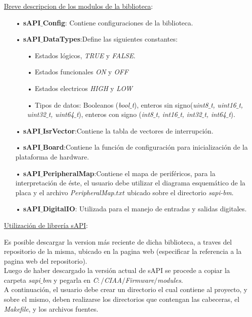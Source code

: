 \documentclass[12pt,letterpaper]{article}
\begin{document}
\underline{Breve descripcion de los modulos de la biblioteca}:
\begin{enumerate}
\item[•]\textbf{sAPI$\_$Config}: Contiene configuraciones de la biblioteca.
\item[•]\textbf{sAPI$\_$DataTypes}:Define las siguientes constantes:
\begin{enumerate}
\item[•]Estados lógicos, \textit{TRUE} y \textit{FALSE}.
\item[•]Estados funcionales \textit{ON} y \textit{OFF}
\item[•]Estados electricos \textit{HIGH} y \textit{LOW}
\item[•]Tipos de datos: Booleanos (\textit{bool$\_$t}), enteros sin signo(\textit{uint8$\_$t, uint16$\_$t, uint32$\_$t, uint64$\_$t}), enteros con signo (\textit{int8$\_$t, int16$\_$t, int32$\_$t, int64$\_$t}).
\end{enumerate}
\item[•]\textbf{sAPI$\_$IsrVector}:Contiene la tabla de vectores de interrupción.
\item[•]\textbf{sAPI$\_$Board}:Contiene la función de configuración para inicialización de la plataforma de hardware.
\item[•]\textbf{sAPI$\_$PeripheralMap}:Contiene el mapa de periféricos, para la interpretación de éste, el usuario debe utilizar el diagrama esquemático de la placa y el archivo \textit{PeripheralMap$.txt$} ubicado sobre el directorio \textit{sapi-bm}.
\item[•]\textbf{sAPI$\_$DigitalIO}: Utilizada para el manejo de entradas y salidas digitales.
\end{enumerate}
 

\underline{Utilización de librería sAPI}:

Es posible descargar la version más reciente de dicha biblioteca, a traves del repositorio de la misma, ubicado en la pagina web (especificar la referencia a la pagina web del repositorio).
 \\
 
Luego de haber descargado la versión actual de  sAPI se procede a copiar la carpeta \textit{sapi$\_$bm} y pegarla en \textit{C$:/$CIAA$/$Firmware$/$modules}.
 \\
 
A continuación, el usuario debe crear un directorio el cual contiene al proyecto, y sobre el mismo, deben realizarse los directorios que contengan las cabeceras, el \textit{Makefile}, y los archivos fuentes.
 \\
 
\end{document}
